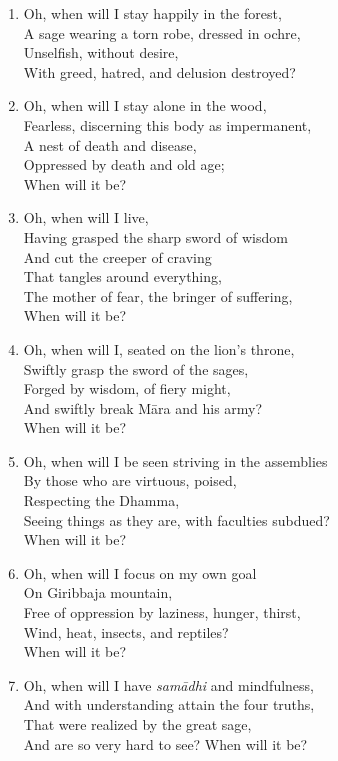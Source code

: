 \documentclass[10pt, openany]{book}
\begin{document}
\begin{enumerate}
\item Oh, when will I stay happily in the forest,\\
A sage wearing a torn robe, dressed in ochre,\\
Unselfish, without desire,\\
With greed, hatred, and delusion destroyed?

\item Oh, when will I stay alone in the wood,\\
Fearless, discerning this body as impermanent,\\
A nest of death and disease,\\
Oppressed by death and old age;\\
When will it be?

\item Oh, when will I live, \\
Having grasped the sharp sword of wisdom\\
And cut the creeper of craving \\
That tangles around everything,\\
The mother of fear, the bringer of suffering,\\
When will it be?

\item Oh, when will I, seated on the lion’s throne,\\
Swiftly grasp the sword of the sages,\\
Forged by wisdom, of fiery might,\\
And swiftly break Māra and his army? \\
When will it be?

\item Oh, when will I be seen striving in the assemblies\\
By those who are virtuous, poised, \\
Respecting the Dhamma,\\
Seeing things as they are, with faculties subdued?\\
When will it be?

\item Oh, when will I focus on my own goal \\
On Giribbaja mountain,\\
Free of oppression by laziness, hunger, thirst,\\
Wind, heat, insects, and reptiles?\\
When will it be?

\item Oh, when will I have \emph{samādhi} and mindfulness,\\
And with understanding attain the four truths,\\
That were realized by the great sage,\\
And are so very hard to see? When will it be?


\end{enumerate}
\end{document}
